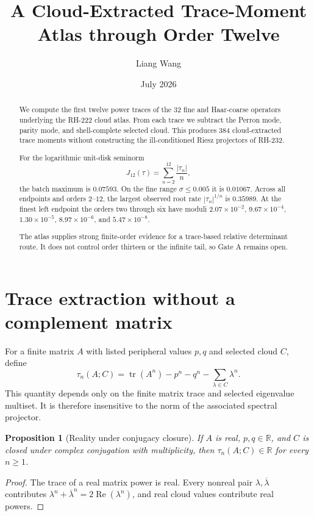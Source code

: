 \documentclass[11pt]{article}
\title{A Cloud-Extracted Trace-Moment Atlas through Order Twelve}
\author{Liang Wang}
\date{July 2026}
\newtheorem{proposition}[theorem]{Proposition}
\theoremstyle{remark}
\begin{document}
\maketitle

\begin{abstract}
We compute the first twelve power traces of the 32 fine and Haar-coarse
operators underlying the RH-222 cloud atlas.  From each trace we subtract the
Perron mode, parity mode, and shell-complete selected cloud.  This produces
384 cloud-extracted trace moments without constructing the ill-conditioned
Riesz projectors of RH-232.

For the logarithmic unit-disk seminorm
\[
 J_{12}(\tau)=\sum_{n=2}^{12}\frac{|\tau_n|}{n},
\]
the batch maximum is $0.07593$.  On the fine range $\sigma\le0.005$ it is
$0.01067$.  Across all endpoints and orders $2$--$12$, the largest observed
root rate $|\tau_n|^{1/n}$ is $0.35989$.  At the finest left endpoint the
orders two through six have moduli $2.07\times10^{-2}$,
$9.67\times10^{-4}$, $1.30\times10^{-5}$, $8.97\times10^{-6}$, and
$5.47\times10^{-8}$.

The atlas supplies strong finite-order evidence for a trace-based relative
determinant route.  It does not control order thirteen or the infinite tail,
so Gate A remains open.
\end{abstract}

\section{Trace extraction without a complement matrix}

For a finite matrix $A$ with listed peripheral values $p,q$ and selected
cloud $C$, define
\begin{equation}\label{eq:tau}
 \tau_n(A;C)=\operatorname{tr}(A^n)-p^n-q^n
 -\sum_{\lambda\in C}\lambda^n.
\end{equation}
This quantity depends only on the finite matrix trace and selected eigenvalue
multiset.  It is therefore insensitive to the norm of the associated
spectral projector.

\begin{proposition}[Reality under conjugacy closure]\label{prop:reality}
If $A$ is real, $p,q\in\mathbb R$, and $C$ is closed under complex
conjugation with multiplicity, then $\tau_n(A;C)\in\mathbb R$ for every
$n\ge1$.
\end{proposition}

\begin{proof}
The trace of a real matrix power is real.  Every nonreal pair
$\lambda,\overline\lambda$ contributes
$\lambda^n+\overline\lambda^n=2\operatorname{Re}(\lambda^n)$, and real
cloud values contribute real powers.
\end{proof}
\end{document}

